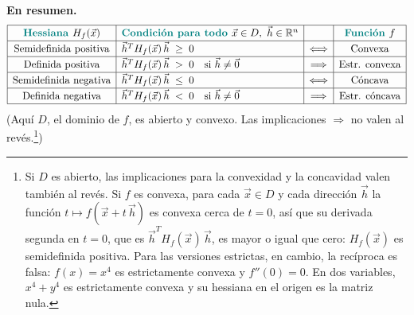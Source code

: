 \documentclass{article}
\newcommand{\R}{\ensuremath{\mathbb{R}}}
\newcommand{\vect}[1]{\vec{#1}}
\begin{document}
\medskip
\noindent\textbf{En resumen.}
\[
\renewcommand{\arraystretch}{1.25}
\begin{array}{|c|l|c|c|}
\hline
\textbf{\color{teal}Hessiana } H_f(\vect{x})
  & \textbf{\color{teal}Condición para todo } \vect{x}\in D,\ \vect{h}\in\R^n
  &
  & \textbf{\color{teal}Función } f \\ \hline
\text{Semidefinida positiva}
  & \vect{h}^{T} H_f(\vect{x})\, \vect{h} \;\ge\; 0
  & \Longleftrightarrow
  & \text{Convexa} \\ \hline
\text{Definida positiva}
  & \vect{h}^{T} H_f(\vect{x})\, \vect{h} \;>\; 0 \quad \text{si } \vect{h}\neq \vect{0}
  & \Longrightarrow
  & \text{Estr. convexa} \\ \hline
\text{Semidefinida negativa}
  & \vect{h}^{T} H_f(\vect{x})\, \vect{h} \;\le\; 0
  & \Longleftrightarrow
  & \text{Cóncava} \\ \hline
\text{Definida negativa}
  & \vect{h}^{T} H_f(\vect{x})\, \vect{h} \;<\; 0 \quad \text{si } \vect{h}\neq \vect{0}
  & \Longrightarrow
  & \text{Estr. cóncava} \\ \hline
\end{array}
\]
{\small (Aquí \(D\), el dominio de \(f\), es abierto y convexo. Las implicaciones \(\Longrightarrow\) no valen al revés.\footnote{\label{nota:reciprocas-convexidad}Si \(D\) es abierto, las implicaciones para la convexidad y la concavidad valen también al revés. Si \(f\) es convexa, para cada \(\vect{x}\in D\) y cada dirección \(\vect{h}\) la función \(t\mapsto f(\vect{x}+t\,\vect{h})\) es convexa cerca de \(t=0\), así que su derivada segunda en \(t=0\), que es \(\vect{h}^{T}H_f(\vect{x})\,\vect{h}\), es mayor o igual que cero: \(H_f(\vect{x})\) es semidefinida positiva. Para las versiones estrictas, en cambio, la recíproca es falsa: \(f(x)=x^4\) es estrictamente convexa y \(f''(0)=0\). En dos variables, \(x^4+y^4\) es estrictamente convexa y su hessiana en el origen es la matriz nula.})}
\end{document}
